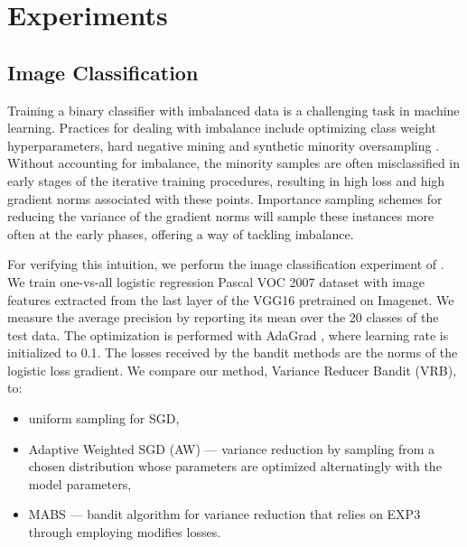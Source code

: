 \newpage
\section{Experiments} \label{sec:experiments}
\subsection{Image Classification}

Training a binary classifier with imbalanced data is a challenging task in machine learning. Practices for dealing with imbalance include optimizing class weight hyperparameters, hard negative mining \citep{shrivastava2016training} and synthetic minority oversampling \citep{chawla2002smote}. 
Without accounting for imbalance, the minority samples are often misclassified in early stages of the iterative training procedures, resulting in high loss and high gradient norms associated with these points. Importance sampling schemes for reducing the variance of the gradient norms will sample these instances more often at the early phases, offering a way of tackling imbalance.

For verifying this intuition, we perform the image classification experiment of \cite{bouchard2015online}. We train one-vs-all logistic regression Pascal VOC 2007 dataset \citep{everingham2010pascal} with image features extracted from the last layer of the VGG16 \citep{simonyan2014very} pretrained on Imagenet. We measure the average precision by reporting its mean over the 20 classes of the test data. The optimization is performed with AdaGrad \citep{duchi2011adaptive}, where learning rate is initialized to 0.1. The losses received by the bandit methods are the norms of the logistic loss gradient.
We compare our method, Variance Reducer Bandit (VRB), to:
\vspace{-1.5mm}
\begin{itemize}
\setlength\itemsep{0.05em}
\item uniform sampling for SGD,
\item Adaptive Weighted SGD (AW) \citep{bouchard2015online} ---  variance reduction by sampling from a chosen distribution whose parameters are optimized alternatingly with the model parameters,
\item MABS \citep{salehi2017} --- bandit algorithm for variance reduction that relies on EXP3 through employing modifies losses.  
\end{itemize}

